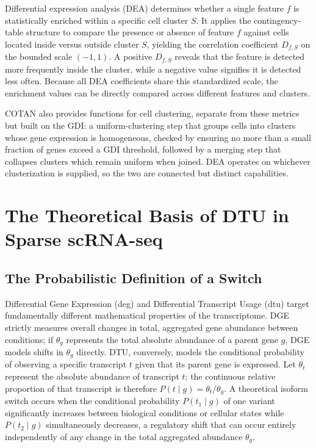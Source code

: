 Differential expression analysis (DEA) determines whether a single feature $f$ is statistically enriched within a specific cell cluster $S$. It applies the contingency-table structure to compare the presence or absence of feature $f$ against cells located inside versus outside cluster $S$, yielding the correlation coefficient $D_{f,S}$ on the bounded scale $(-1, 1)$. A positive $D_{f,S}$ reveals that the feature is detected more frequently inside the cluster, while a negative value signifies it is detected less often. Because all DEA coefficients share this standardized scale, the enrichment values can be directly compared across different features and clusters.

COTAN also provides functions for cell clustering, separate from these metrics but built on the GDI: a uniform-clustering step that groups cells into clusters whose gene expression is homogeneous, checked by ensuring no more than a small fraction of genes exceed a GDI threshold, followed by a merging step that collapses clusters which remain uniform when joined. DEA operates on whichever clusterization is supplied, so the two are connected but distinct capabilities.

\section{The Theoretical Basis of DTU in Sparse scRNA-seq}

\subsection{The Probabilistic Definition of a Switch}

Differential Gene Expression (\gls{deg}) and Differential Transcript Usage (\gls{dtu}) target fundamentally different mathematical properties of the transcriptome. DGE strictly measures overall changes in total, aggregated gene abundance between conditions; if $\theta_g$ represents the total absolute abundance of a parent gene $g$, DGE models shifts in $\theta_g$ directly. DTU, conversely, models the conditional probability of observing a specific transcript $t$ given that its parent gene is expressed. Let $\theta_t$ represent the absolute abundance of transcript $t$; the continuous relative proportion of that transcript is therefore $P(t \mid g) = \theta_t / \theta_g$. A theoretical isoform switch occurs when the conditional probability $P(t_1 \mid g)$ of one variant significantly increases between biological conditions or cellular states while $P(t_2 \mid g)$ simultaneously decreases, a regulatory shift that can occur entirely independently of any change in the total aggregated abundance $\theta_g$.

